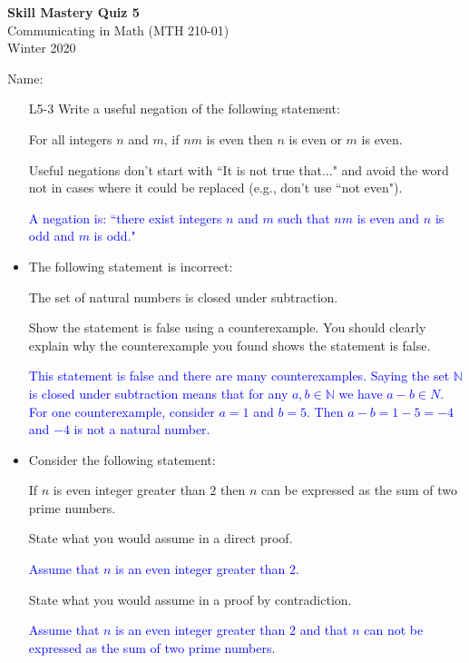 \documentclass[10pt]{article}
\newcommand{\N}{\mathbb{N}}
\newcommand{\bs}{\begin{solution}}
\begin{document}
\vspace{-1.2in}
\begin{center} \textbf{\Large{Skill Mastery Quiz 5}} \\
Communicating in Math (MTH 210-01)\\
Winter 2020
\end{center}



\noindent Name: 




\begin{itemize}
	

\item[L5-3] Write a useful negation of the following statement:
		\begin{center}
For all integers $n$ and $m$, if $nm$ is even then $n$ is even or $m$ is even.		\end{center}
		Useful negations don't start with ``It is not true that..." and avoid the word not in cases where it could be replaced (e.g., don't use ``not even").

\bs \textcolor{blue}{A negation is: ``there exist integers $n$ and $m$ such that $nm$ is even and $n$ is odd and $m$ is odd."}
\end{solution}

\vfill

\item[P3-1]  The following statement is incorrect:
		\begin{center}
The set of natural numbers is closed under subtraction.		
	\end{center}
			Show the statement is false using a counterexample. You should clearly explain why the counterexample you found shows the statement is false.


\bs \textcolor{blue}{This statement is false and there are many counterexamples. Saying the set $\N$ is closed under subtraction means that for any $a,b\in\N$ we have $a-b\in N$. For one counterexample, consider $a=1$ and $b=5$. Then $a-b = 1-5 = -4$ and $-4$ is not a natural number.}\end{solution}
\vfill

\newpage

\item[P1-1] Consider the following statement:
		\begin{center}
		If $n$ is even integer greater than $2$ then $n$ can be expressed as the sum of two prime numbers.
		\end{center}
	State what you would assume in a direct proof. 
	
	\bs\textcolor{blue}{Assume that $n$ is an even integer greater than $2$.}\end{solution}
	
	\vfill
	
	
	State what you would assume in a proof by contradiction.
	
	\bs\textcolor{blue}{Assume that $n$ is an even integer greater than $2$ and that $n$ can not be expressed as the sum of two prime numbers.}\end{solution}
\vfill

\end{itemize}
	
\end{document}
